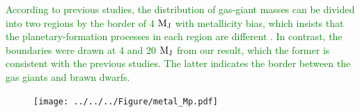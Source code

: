 \documentclass[twocolumn, dvipdfmx]{aastex62}
\begin{document}
\begin{CJK*}{UTF8}{min}
\textcolor{green}{According to previous studies, the distribution of gas-giant masses can be divided into two regions by the border of 4 $\rm M_J$ with metallicity bias, which insists that the planetary-formation processes in each region are different \citep[e.g.,][]{2017A&A...603A..30S}. In contrast, the boundaries were drawn at 4 and 20 $\rm M_J$ from our result, which the former is consistent with the previous studies. The latter indicates the border between the gas giants and brawn dwarfs.}

\begin{figure}[t]
\begin{center}
\texttt{[image: ../../../Figure/metal\_Mp.pdf]}
\caption{\label{fig:metal_Mp}}
\end{center}
\end{figure}


\acknowledgments


\vspace{5mm}


\begin{thebibliography}{}


\end{thebibliography}
\end{CJK*}
\end{document}
